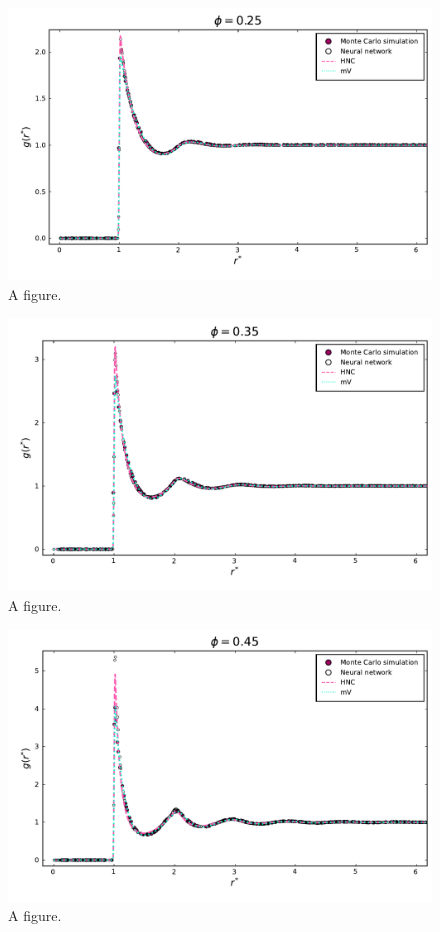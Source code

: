 \begin{figure}
    \centering
    \includegraphics[width=\textwidth]{figuras/capitulo-3/comparison_p=0.25.pdf}
    \caption[New figure.]{A figure.}
    \label{fig:rdf25}
\end{figure}

\begin{figure}
    \centering
    \includegraphics[width=\textwidth]{figuras/capitulo-3/comparison_p=0.35.pdf}
    \caption[New figure.]{A figure.}
    \label{fig:rdf35}
\end{figure}

\begin{figure}
    \centering
    \includegraphics[width=\textwidth]{figuras/capitulo-3/comparison_p=0.45.pdf}
    \caption[New figure.]{A figure.}
    \label{fig:rdf45}
\end{figure}

